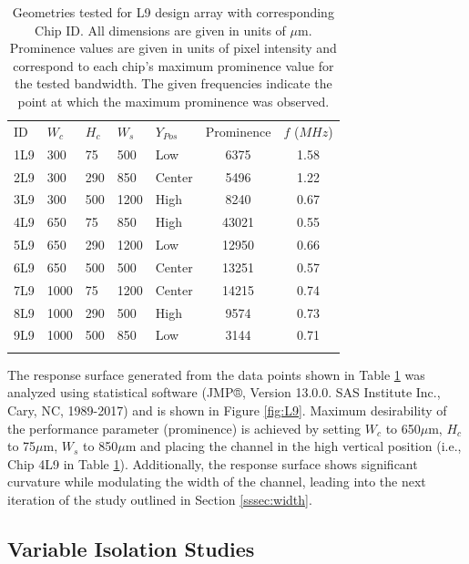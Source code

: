 \begin{table}[h]
\caption[Geometries tested for L9 design array]{Geometries tested for L9 design array with corresponding Chip ID. All dimensions are given in units of $\mu$m. Prominence values are given in units of pixel intensity and correspond to each chip's maximum prominence value for the tested bandwidth. The given frequencies indicate the point at which the maximum prominence was observed.}
\label{tab:geometries}       %
\centering
\begin{tabular}{lllll|cc}
\hline\noalign{\smallskip}
ID & $W_c$ & $H_c$ & $W_s$ & $Y_{Pos}$ & Prominence & $f$ ($MHz$) \\
\noalign{\smallskip}\hline\noalign{\smallskip}
1L9 & 300 & 75 & 500 & Low & 6375 & 1.58\\
2L9 & 300 & 290 & 850 & Center & 5496 & 1.22\\
3L9 & 300 & 500 & 1200 & High & 8240 & 0.67\\
4L9 & 650 & 75 & 850 & High & 43021 & 0.55\\
5L9 & 650 & 290 & 1200 & Low & 12950 & 0.66\\
6L9 & 650 & 500 & 500 & Center & 13251 & 0.57\\
7L9 & 1000 & 75 & 1200 & Center & 14215 & 0.74\\
8L9 & 1000 & 290 & 500 & High & 9574 & 0.73\\
9L9 & 1000 & 500 & 850 & Low & 3144 & 0.71\\
\noalign{\smallskip}\hline
\end{tabular}
\end{table}

The response surface generated from the data points shown in Table \ref{tab:geometries} was analyzed using statistical software (JMP®, Version 13.0.0. SAS Institute Inc., Cary, NC, 1989-2017) and is shown in Figure \ref{fig:L9}. Maximum desirability of the performance parameter (prominence) is achieved by setting $W_c$ to 650$\mu$m, $H_c$ to 75$\mu$m, $W_s$ to 850$\mu$m and placing the channel in the high vertical position (i.e., Chip 4L9 in Table \ref{tab:geometries}). Additionally, the response surface shows significant curvature while modulating the width of the channel, leading into the next iteration of the study outlined in Section \ref{sssec:width}.

\subsection{Variable Isolation Studies}
\label{ssec:iso}


